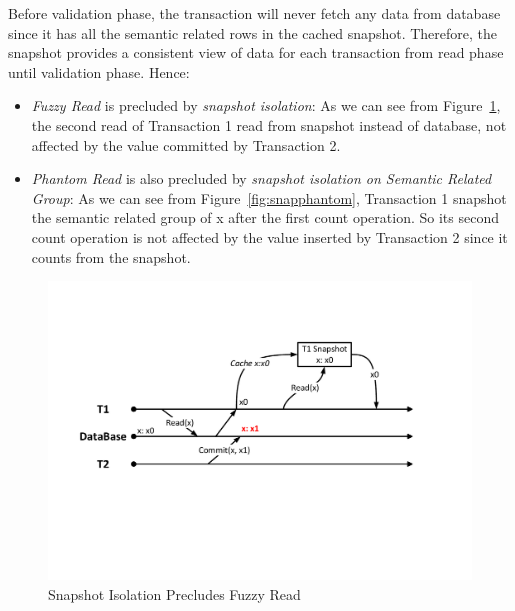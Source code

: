 \noindent Before validation phase, the transaction will never fetch any data from database since it has all the semantic related rows in the cached snapshot. Therefore, the snapshot provides a consistent view of data for each transaction from read phase until validation phase. Hence: 
\begin{itemize}[noitemsep]
	\item \textit{Fuzzy Read} is precluded by \textit{snapshot isolation}: As we can see from Figure~\ref{fig:snapfuzzy}, the second read of Transaction 1 read from snapshot instead of database, not affected by the value committed by Transaction 2.
	
	\item \textit{Phantom Read} is also precluded by \textit{snapshot isolation on Semantic Related Group}: As we can see from Figure~\ref{fig:snapphantom}, Transaction 1 snapshot the semantic related group of x after the first count operation. So its second count operation is not affected by the value inserted by Transaction 2 since it counts from the snapshot.
	
\end{itemize} 

\begin{figure}[!h]
	\centering
	\includegraphics[width=\linewidth]{figs/snapfuzzy.pdf}
	\caption{Snapshot Isolation Precludes Fuzzy Read}
	\label{fig:snapfuzzy}
\end{figure}

